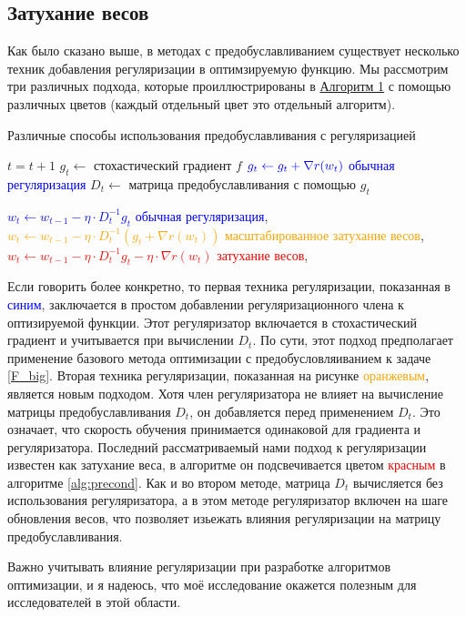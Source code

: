 \subsection{Затухание весов}
Как было сказано выше, в методах с предобуславливанием существует несколько техник добавления регуляризации в оптимзируемую функцию. Мы рассмотрим три различных подхода, которые проиллюстрированы в \hyperref[alg:precond]{Алгоритм 1} с помощью различных цветов (каждый отдельный цвет это отдельный алгоритм).

\begin{algorithm}[H]
    \caption{Различные способы использования предобуславливания с регуляризацией}
    \label{alg:precond}
    
    \begin{algorithmic}
            
            \State $t = t+1$
            \State $g_t \gets$ стохастический градиент $f$
            \State $\textcolor{blue}{g_t \gets g_t + \nabla r(w_t)}$ \hfill \textcolor{blue}{обычная регуляризация}
            \State $D_t \gets$ матрица предобуславливания с помощью $g_t$

            \State \textcolor{blue}{$w_t \gets w_{t-1} - \eta \cdot D_t^{-1}g_t $} \hfill \textcolor{blue}{обычная регуляризация}, 
            \State \textcolor{orange}{$w_t \gets w_{t-1} - \eta \cdot D_t^{-1} \left(g_t +\nabla r(w_t) \right)$} \hfill \textcolor{orange}{масштабированное затухание весов}, 
            \State \textcolor{red}{$w_t \gets w_{t-1} - \eta \cdot D_t^{-1} g_t  - \eta \cdot \nabla r(w_t)$} \hfill \textcolor{red}{затухание весов}, 
            \EndWhile
    \end{algorithmic}
\end{algorithm}

Если говорить более конкретно, то первая техника регуляризации, показанная в \textcolor{blue}{синим}, заключается в простом добавлении регуляризационного члена к оптизируемой функции. Этот регуляризатор включается в стохастический градиент и учитывается при вычислении $D_t$. По сути, этот подход предполагает применение базового метода оптимизации с предобусловляиванием к задаче \eqref{F_big}.
Вторая техника регуляризации, показанная на рисунке \textcolor{orange}{оранжевым}, является новым подходом. Хотя член регуляризатора не влияет на вычисление матрицы предобуславливания $D_t$, он добавляется перед применением $D_t$. Это означает, что скорость обучения принимается одинаковой для градиента и регуляризатора.
Последний рассматриваемый нами подход к регуляризации известен как затухание веса, в алгоритме он подсвечивается цветом \textcolor{red}{красным} в алгоритме \ref{alg:precond}.
Как и во втором методе, матрица $D_t$ вычисляется без использования регуляризатора, а в этом методе регуляризатор включен на шаге обновления весов, что позволяет изьежать влияния регуляризации на матрицу предобуславливания.

Важно учитывать влияние регуляризации при разработке алгоритмов оптимизации, и я надеюсь, что моё исследование окажется полезным для исследователей в этой области.
